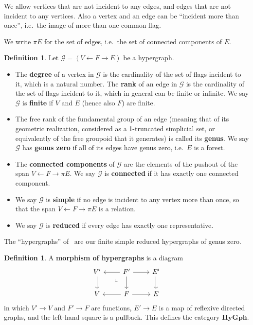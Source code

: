 \documentclass{article}
\theoremstyle{definition}
\newtheorem{defn}[thm]{Definition}
\theoremstyle{remark}
\def\G{\mathcal{G}}
\newcommand{\dlpullback}[1][dl]{\ar[#1,phantom,near start,"\llcorner"]}
\let\ot\leftarrow
\def\hy{\mathbf{HyGph}}
\begin{document}
We allow vertices that are not incident to any edges, and edges that are not incident to any vertices.
Also a vertex and an edge can be ``incident more than once'', i.e.\ the image of more than one common flag.

We write $\pi E$ for the set of edges, i.e.\ the set of connected components of $E$.

\begin{defn}
  Let $\G=(V\ot F\to E)$ be a hypergraph.
  \begin{itemize}
  \item The \textbf{degree} of a vertex in $\G$ is the cardinality of the set of flags incident to it, which is a natural number.
    The \textbf{rank} of an edge in $\G$ is the cardinality of the set of flags incident to it, which in general can be finite or infinite.
    We say $\G$ %
    is \textbf{finite} if $V$ and $E$ (hence also $F$) are finite.
  \item The free rank of the fundamental group of an edge (meaning that of its geometric realization, considered as a 1-truncated simplicial set, or equivalently of the free groupoid that it generates) is called its \textbf{genus}.
    We say $\G$ has \textbf{genus zero} if all of its edges have genus zero, i.e.\ $E$ is a forest.
  \item The \textbf{connected components} of $\G$ are the elements of the pushout of the span $V \leftarrow F \to \pi E$.
    We say $\G$ is \textbf{connected} if it has exactly one connected component.
  \item We say $\G$ is \textbf{simple} if no edge is incident to any vertex more than once, so that the span $V \ot F \to \pi E$ is a relation.
  \item We say $\G$ is \textbf{reduced} if every edge has exactly one representative.
  \end{itemize}
\end{defn}

The ``hypergraphs'' of~\cite{glpn:directed-hypergraphs} are our finite simple reduced hypergraphs of genus zero.

\begin{defn}
  A \textbf{morphism of hypergraphs} is a diagram
  \[
  \begin{tikzcd}
    V' \ar[d] & F' \ar[d] \ar[r] \ar[l] \dlpullback[dl] & E' \ar[d]\\
    V  & F \ar[r] \ar[l] & E
  \end{tikzcd}
  \]
  in which $V'\to V$ and $F'\to F$ are functions, $E'\to E$ is a map of reflexive directed graphs, and the left-hand square is a pullback.
  This defines the category $\hy$.
\end{defn}
\end{document}
